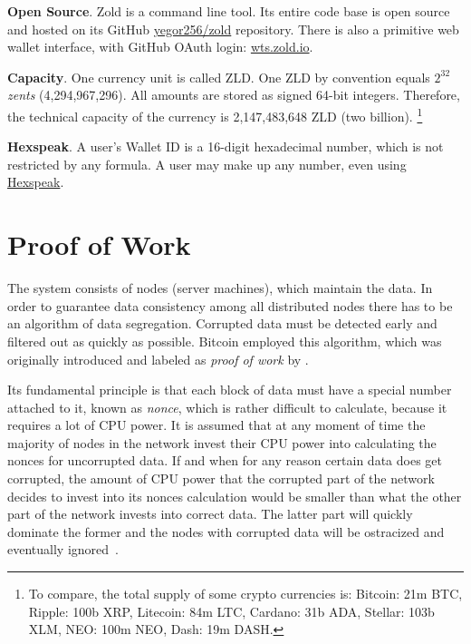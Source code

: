 \documentclass{main}
\begin{document}
\textbf{Open Source}.
Zold is a command line tool. Its entire code base is open source
and hosted on its GitHub \href{https://github.com/yegor256/zold}{yegor256/zold}
repository. There is also a primitive web wallet interface, with
GitHub OAuth login: \href{https://wts.zold.io}{wts.zold.io}.

\textbf{Capacity}.
One currency unit is called ZLD.
One ZLD by convention equals $2^{32}$ \emph{zents} (4,294,967,296).
All amounts are stored as signed 64-bit integers.
Therefore, the technical capacity of the currency is 2,147,483,648 ZLD (two billion).%
\footnote{%
  To compare, the total supply of some crypto currencies is:
  Bitcoin: 21m BTC,
  Ripple: 100b XRP,
  Litecoin: 84m LTC,
  Cardano: 31b ADA,
  Stellar: 103b XLM,
  NEO: 100m NEO,
  Dash: 19m DASH.
}

\textbf{Hexspeak}.
A user's Wallet ID is a 16-digit hexadecimal number, which is not restricted by any formula.
A user may make up any number, even using
\href{https://en.wikipedia.org/wiki/Hexspeak}{Hexspeak}.

\section{Proof of Work}\label{sec:score}

The system consists of nodes (server machines), which maintain the data.
In order to guarantee data consistency among all distributed nodes
there has to be an algorithm of data segregation.
Corrupted data must be detected early and filtered out as quickly as possible.
Bitcoin employed this algorithm, which was originally introduced and labeled as
\emph{proof of work} by \textcite{back1997}.

Its fundamental principle is that each block of data must have a special
number attached to it, known as \emph{nonce}, which is rather difficult to calculate,
because it requires a lot of CPU power. It is assumed that at any moment
of time the majority of nodes in the network invest their CPU power into
calculating the nonces for uncorrupted data. If and when for any reason
certain data does get corrupted, the amount of CPU power that the corrupted part of the network
decides to invest into its nonces calculation would be smaller than what
the other part of the network invests into correct data. The latter part
will quickly dominate the former and the nodes with corrupted data will
be ostracized and eventually ignored~\parencite{nakamoto2008}.
\end{document}
